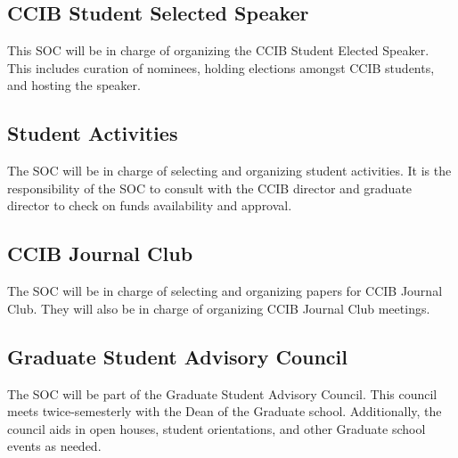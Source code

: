 \subsection{CCIB Student Selected Speaker}

This SOC will be in charge of organizing the CCIB Student Elected Speaker. This includes curation of nominees, holding elections amongst CCIB students, and hosting the speaker. 

\subsection{Student Activities}

The SOC will be in charge of selecting and organizing student activities. It is the responsibility of the SOC to consult with the CCIB director and graduate director to check on funds availability and approval.

\subsection{CCIB Journal Club}

The SOC will be in charge of selecting and organizing papers for CCIB Journal Club. They will also be in charge of organizing CCIB Journal Club meetings. 


\subsection{Graduate Student Advisory Council}

The SOC will be part of the Graduate Student Advisory Council. This council meets twice-semesterly with the Dean of the Graduate school. Additionally, the council aids in open houses, student orientations, and other Graduate school events as needed.




